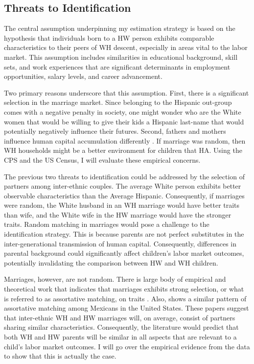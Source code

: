 \subsection{Threats to Identification}

The central assumption underpinning my estimation strategy is based on the hypothesis that individuals born to a HW person exhibits comparable characteristics to their peers of WH descent, especially in areas vital to the labor market. This assumption includes similarities in educational background, skill sets, and work experiences that are significant determinants in employment opportunities, salary levels, and career advancement. 

Two primary reasons underscore that this assumption. First, there is a significant selection in the marriage market. Since belonging to the Hispanic out-group comes with a negative penalty in society, one might wonder who are the White women that would be willing to give their kids a Hispanic last-name that would potentially negatively influence their futures. Second, fathers and mothers influence human capital accumulation differently \autocite{kimball2009risk,magruder2010intergenerational}. If marriage was random, then WH households might be a better environment for children that HA. Using the CPS and the US Census, I will evaluate these empirical concerns. 

The previous two threats to identification could be addressed by the selection of partners among inter-ethnic couples. The average White person exhibits better observable characteristics than the Average Hispanic. Consequently, if marriages were random, the White husband in an WH marriage would have better traits than wife, and the White wife in the HW marriage would have the stronger traits. Random matching in marriages would pose a challenge to the identification strategy. This is because parents are not perfect substitutes in the inter-generational transmission of human capital. Consequently, differences in parental background could significantly affect children's labor market outcomes, potentially invalidating the comparison between HW and WH children.

Marriages, however, are not random. There is large body of empirical and theoretical work that indicates that marriages exhibits strong selection, or what is referred to as assortative matching, on traits \autocite{averettBetterWorseRelationship2008, averettEconomicRealityBeauty1996, beckerTheoryMarriagePart1973, beckerTheoryMarriagePart1974, beckerTreatiseFamily1993, browningCollectiveUnitaryModels2006, chiapporiFatterAttractionAnthropometric2012}. Also, \textcite{duncanIntermarriageIntergenerationalTransmission2011} shows a similar pattern of assortative matching among Mexicans in the United States. These papers suggest that inter-ethnic WH and HW marriages will, on average, consist of partners sharing similar characteristics. Consequently, the literature would predict that both WH and HW parents will be similar in all aspects that are relevant to a child's labor market outcomes. I will go over the empirical evidence from the data to show that this is actually the case.

